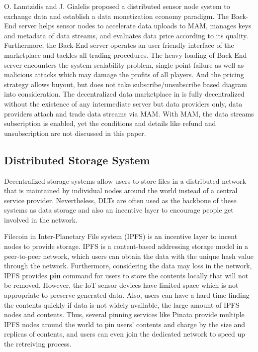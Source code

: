 \documentclass[conference]{IEEEtran}
\begin{document}
O. Lamtzidis and J. Gialelis \cite{IOTASensorNode} proposed a distributed sensor node system to exchange data and establish a data monetization economy paradigm. The Back-End server helps sensor nodes to accelerate data uploads to MAM, manages keys and metadata of data streams, and evaluates data price according to its quality. Furthermore, the Back-End server operates an user friendly interface of the marketplace and tackles all trading procedures. The heavy loading of Back-End server encounters the system scalability problem, single point failure as well as malicious attacks which may damage the profits of all players. And the pricing strategy allows buyout, but does not take subscribe/unsubscribe based diagram into consideration. The decentralized data marketplace in \cite{DDMSmartCities} is fully decentralized without the existence of any intermediate server but data providers only, data providers attach and trade data streams via MAM. With MAM, the data streams subscription is enabled, yet the conditions and details like refund and unsubscription are not discussed in this paper.
 
\subsection{Distributed Storage System}
\label{section:distributed_storage}
Decentralized storage systems allow users to store files in a distributed network that is maintained by individual nodes around the world instead of a central service provider. Nevertheless, DLTs are often used as the backbone of these systems as data storage and also an incentive layer to encourage people get involved in the network. 

Filecoin \cite{FileCoin} in Inter-Planetary File system (IPFS) is an incentive layer to incent nodes to provide storage. IPFS is a content-based addressing storage model in a peer-to-peer network, which users can obtain the data with the unique hash value through the network. Furthermore, considering the data may loss in the network, IPFS provides \textbf{pin} command for users to store the contents locally that will not be removed. However, the IoT sensor devices have limited space which is not appropriate to preserve generated data. Also, users can have a hard time finding the contents quickly if data is not widely available, the large amount of IPFS nodes and contents. Thus, several pinning services like Pinata provide multiple IPFS nodes around the world to pin users' contents and charge by the size and replicas of contents, and users can even join the dedicated network to speed up the retreiving process.
\end{document}

